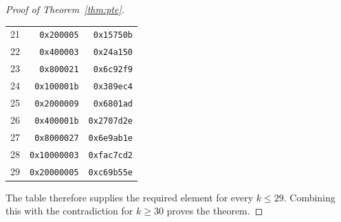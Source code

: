 \documentclass[11pt]{article}
\begin{document}
\begin{proof}[Proof of Theorem~\ref{thm:pte}]
\begin{center}
\begin{tabular}{rrr}
21 & \texttt{0x200005} & \texttt{0x15750b}\\
22 & \texttt{0x400003} & \texttt{0x24a150}\\
23 & \texttt{0x800021} & \texttt{0x6c92f9}\\
24 & \texttt{0x100001b} & \texttt{0x389ec4}\\
25 & \texttt{0x2000009} & \texttt{0x6801ad}\\
26 & \texttt{0x400001b} & \texttt{0x2707d2e}\\
27 & \texttt{0x8000027} & \texttt{0x6e9ab1e}\\
28 & \texttt{0x10000003} & \texttt{0xfac7cd2}\\
29 & \texttt{0x20000005} & \texttt{0xc69b55e}\\
\end{tabular}
\end{center}
The table therefore supplies the required element for every $k\le29$.
Combining this with the contradiction for $k\ge30$ proves the theorem.
\end{proof}
\end{document}
